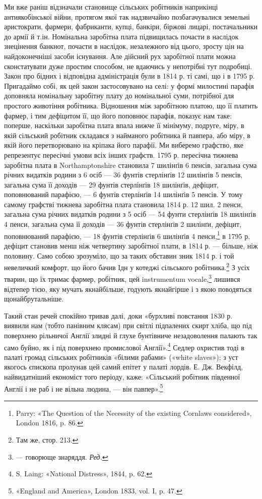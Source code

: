 Ми вже раніш відзначали становище сільських робітників
наприкінці антиякобінської війни, протягом якої так надзвичайно
позбагачувалися земельні аристократи, фармери, фабриканти,
купці, банкіри, біржові лицарі, постачальники до армії
й т.ін. Номінальна заробітна плата підвищилась почасти в наслідок
знецінення банкнот, почасти в наслідок, незалежного від
цього, зросту цін на найдоконечніші засоби існування. Але дійсний
рух заробітної плати можна сконстатувати дуже простим
способом, не вдаючись у непотрібні тут подробиці. Закон про
бідних і відповідна адміністрація були в 1814 р. ті самі, що і в
1795 р. Пригадаймо собі, як цей закон застосовувано на селі:
у формі милостині парафія доповняла номінальну заробітну
плату до номінальної суми, потрібної для простого животіння
робітника. Відношення між заробітною платою, що її платить
фармер, і тим дефіцитом її, що його поповнює парафія, показує
нам таке: поперше, наскільки заробітна плата впала нижче її
мінімуму, подруге, міру, в якій сільський робітник складався
з найманого робітника й павпера, або міру, в якій його перетворювано
на кріпака його парафії. Ми виберемо графство, яке
репрезентує пересічні умови всіх інших графств. 1795 р. пересічна
тижнева заробітна плата в Northamptonshire становила
7 шилінґів 6 пенсів, загальна сума річних видатків родини з
6 осіб — 36 фунтів стерлінґів 12 шилінґів 5 пенсів, загальна сума
її доходів — 29 фунтів стерлінґів 18 шилінґів, дефіцит, поповнюваний
парафією, — 6 фунтів стерлінґів 14 шилінґів 5 пенсів.
У тому самому графстві тижнева заробітна плата становила 1814 р.
12 шил. 2 пенси, загальна сума річних видатків родини з 5 осіб —
54 фунти стерлінґів 18 шилінґів 4 пенси, загальна сума її доходів
— 36 фунтів стерлінґів 2 шилінґи, дефіцит, поповнюваний
парафією, — 18 фунтів стерлінґів 6 шилінґів 4 пенси,\footnote{
Parry: «The Question of the Necessity of the existing Cornlaws
considered», London 1816, p. 86.
} в 1795 р.
дефіцит становив менш ніж четвертину заробітної плати, в
1814 р. — більше, ніж половину. Само собою зрозуміло, що за
таких обставин зник 1814 р. і той невеличкий комфорт, що його
бачив Ідн у котеджі сільського робітника.\footnote{
Там же, стор. 213.
} З усіх тварин,
що їх тримає фармер, робітник, цей instrumentum vocale,\footnote*{
— говорюще знаряддя. \emph{Ред.}
} лишився
відтепер тією, яку мучать якнайбільше, годують якнайгірше і
з  якою поводяться щонайбрутальніше.

Такий стан речей спокійно тривав далі, доки «бурхливі повстання
1830 р. виявили нам (тобто панівним клясам) при світлі
підпалених скирт хліба, що під поверхнею рільничої Англії
злидні й глухе бунтівниче незадоволення палають так само буйно,
як і під поверхнею промислової Англії».\footnote{
S. Laing: «National Distress», 1844, p. 62.
} Седлер охристив тоді
в палаті громад сільських робітників «білими рабами» («white
slaves»); з уст якогось єпископа пролунав цей самий епітет у палаті
лордів. Е. Дж. Векфілд, найвидатніший економіст того періоду,
каже: «Сільський робітник південної Англії і не раб
і не вільна людина, — він павпер».\footnote{
«England and America», London 1833, vol. I, p. 47.
}

